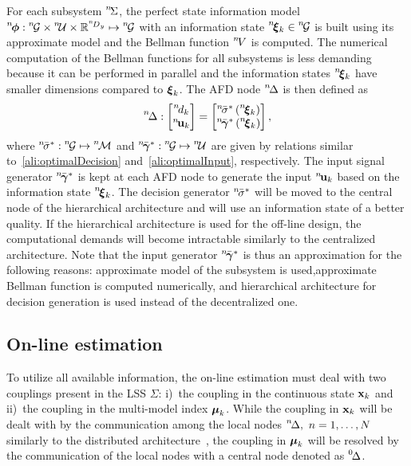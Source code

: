 \documentclass[conference,10pt]{IEEEtran}
\def\zeroth{\prescript{0\!}{}}
\def\nth{\prescript{n\!}{}}
\def\dec{\text{dec}}
\begin{document}
For each subsystem $\nth{\Sigma}$, the perfect state information model $\nth{\bfphi}:\nth{\mcG} \times \nth{\mcU} \times \bbR^{\nth{D}_y} \mapsto \nth{\mcG}$ with an information state $\nth{\bfxi}_{k}\in\nth{\mcG}$ is built using its approximate model and the Bellman function $\nth{V}$ is computed. 
The numerical computation of the Bellman functions for all subsystems is less demanding because it can be performed in parallel and the information states $\nth{\bfxi}_{k}$ have smaller dimensions compared to $\boldsymbol{\xi}_{k}$. 
The AFD node $\nth{\Delta}$ is then defined as
\begin{align}\label{ali:DeAFD}
	\nth{\Delta}:
	\begin{bmatrix}
		\nth{d}_{k}\\
		\nth{\bfu}_{k}
	\end{bmatrix} =%
	\begin{bmatrix}
		\nth{\bar{\sigma}}^{*} \left( \nth{\bfxi}_{k} \right)\\
		\nth{\bar{\bfgamma}}^{*} \left( \nth{\bfxi}_{k} \right)
	\end{bmatrix},
\end{align} 
where $\nth{\bar{\sigma}}^{*}:\nth{\mcG}\mapsto\nth{\mcM}$ and $\nth{\bar{\bfgamma}}^{*}:\nth{\mcG} \mapsto \nth{\mcU}$ are given by relations similar to~\eqref{ali:optimalDecision} and~\eqref{ali:optimalInput}, respectively. 
The input signal generator $\nth{\bar{\bfgamma}}^{*}$ is kept at each AFD node to generate the input $\nth{\bfu}_{k}$ based on the information state $\nth{\bfxi}_{k}$. 
The decision generator $\nth{\bar{\sigma}}^{*}$ will be moved to the central node of the hierarchical architecture and will use an information state of a better quality. 
If the hierarchical architecture is used for the off-line design, the computational demands will become intractable similarly to the centralized architecture. 
Note that the input generator $\nth{\bar{\bfgamma}}^{*}$ is thus an approximation for the following reasons: approximate model of the subsystem is used,approximate Bellman function is computed numerically, and hierarchical architecture for decision generation is used instead of the decentralized one. 
\subsection{On-line estimation}\label{sec:on_line_estimation}
To utilize all available information, the on-line estimation must deal with two couplings present in the LSS $\Sigma$: i)~the coupling in the continuous state $\mathbf{x}_k$ and ii)~the coupling in the multi-model index $\boldsymbol{\mu}_k$.
While the coupling in $\mathbf{x}_k$ will be dealt with by the communication among the local nodes $\nth{\Delta},\ n=1,\ldots,N$ similarly to the distributed architecture~\cite{Straka2019:cp:FUSION}, the coupling in $\boldsymbol{\mu}_k$ will be resolved by the communication of the local nodes with a central node denoted as $\zeroth{\Delta}$.
\end{document}
